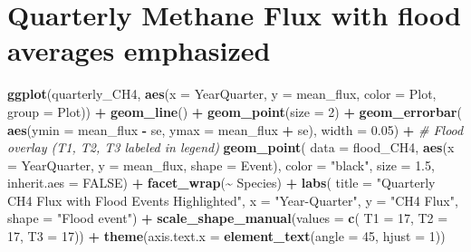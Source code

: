 \documentclass[
]{article}
\newenvironment{Shaded}{\begin{snugshade}}{\end{snugshade}}
\newcommand{\AttributeTok}[1]{\textcolor[rgb]{0.13,0.29,0.53}{#1}}
\newcommand{\CommentTok}[1]{\textcolor[rgb]{0.56,0.35,0.01}{\textit{#1}}}
\newcommand{\ConstantTok}[1]{\textcolor[rgb]{0.56,0.35,0.01}{#1}}
\newcommand{\DecValTok}[1]{\textcolor[rgb]{0.00,0.00,0.81}{#1}}
\newcommand{\FloatTok}[1]{\textcolor[rgb]{0.00,0.00,0.81}{#1}}
\newcommand{\FunctionTok}[1]{\textcolor[rgb]{0.13,0.29,0.53}{\textbf{#1}}}
\newcommand{\NormalTok}[1]{#1}
\newcommand{\SpecialCharTok}[1]{\textcolor[rgb]{0.81,0.36,0.00}{\textbf{#1}}}
\newcommand{\StringTok}[1]{\textcolor[rgb]{0.31,0.60,0.02}{#1}}
\begin{document}
\section{Quarterly Methane Flux with flood averages
emphasized}\label{quarterly-methane-flux-with-flood-averages-emphasized}

\begin{Shaded}
\begin{Highlighting}[]
\FunctionTok{ggplot}\NormalTok{(quarterly\_CH4,}
       \FunctionTok{aes}\NormalTok{(}\AttributeTok{x =}\NormalTok{ YearQuarter, }\AttributeTok{y =}\NormalTok{ mean\_flux, }\AttributeTok{color =}\NormalTok{ Plot, }\AttributeTok{group =}\NormalTok{ Plot)) }\SpecialCharTok{+}
  \FunctionTok{geom\_line}\NormalTok{() }\SpecialCharTok{+}
  \FunctionTok{geom\_point}\NormalTok{(}\AttributeTok{size =} \DecValTok{2}\NormalTok{) }\SpecialCharTok{+}
  \FunctionTok{geom\_errorbar}\NormalTok{(}
    \FunctionTok{aes}\NormalTok{(}\AttributeTok{ymin =}\NormalTok{ mean\_flux }\SpecialCharTok{{-}}\NormalTok{ se,}
        \AttributeTok{ymax =}\NormalTok{ mean\_flux }\SpecialCharTok{+}\NormalTok{ se),}
    \AttributeTok{width =} \FloatTok{0.05}\NormalTok{) }\SpecialCharTok{+}
  \CommentTok{\# Flood overlay (T1, T2, T3 labeled in legend)}
  \FunctionTok{geom\_point}\NormalTok{(}
    \AttributeTok{data =}\NormalTok{ flood\_CH4,}
    \FunctionTok{aes}\NormalTok{(}\AttributeTok{x =}\NormalTok{ YearQuarter,}
        \AttributeTok{y =}\NormalTok{ mean\_flux,}
        \AttributeTok{shape =}\NormalTok{ Event),}
    \AttributeTok{color =} \StringTok{"black"}\NormalTok{,}
    \AttributeTok{size =} \FloatTok{1.5}\NormalTok{,}
    \AttributeTok{inherit.aes =} \ConstantTok{FALSE}\NormalTok{) }\SpecialCharTok{+}
  \FunctionTok{facet\_wrap}\NormalTok{(}\SpecialCharTok{\textasciitilde{}}\NormalTok{ Species) }\SpecialCharTok{+}
  \FunctionTok{labs}\NormalTok{( }\AttributeTok{title =} \StringTok{"Quarterly CH4 Flux with Flood Events Highlighted"}\NormalTok{,}
        \AttributeTok{x =} \StringTok{"Year{-}Quarter"}\NormalTok{,}
        \AttributeTok{y =} \StringTok{"CH4 Flux"}\NormalTok{,}
        \AttributeTok{shape =} \StringTok{"Flood event"}\NormalTok{) }\SpecialCharTok{+}
  \FunctionTok{scale\_shape\_manual}\NormalTok{(}\AttributeTok{values =} \FunctionTok{c}\NormalTok{(}
    \AttributeTok{T1 =} \DecValTok{17}\NormalTok{,}
    \AttributeTok{T2 =} \DecValTok{17}\NormalTok{,}
    \AttributeTok{T3 =} \DecValTok{17}\NormalTok{)) }\SpecialCharTok{+}
  \FunctionTok{theme}\NormalTok{(}\AttributeTok{axis.text.x =} \FunctionTok{element\_text}\NormalTok{(}\AttributeTok{angle =} \DecValTok{45}\NormalTok{, }\AttributeTok{hjust =} \DecValTok{1}\NormalTok{))}
\end{Highlighting}
\end{Shaded}
\end{document}
